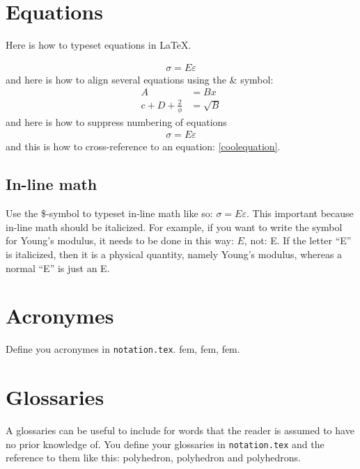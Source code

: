 \section{Equations}
Here is how to typeset equations in \LaTeX{}.

\begin{align}
\sigma = E\varepsilon \label{coolequation}
\end{align}
and here is how to align several equations using the \& symbol:
\begin{align}
A &= Bx \\ %
c + D +\frac{2}{\phi} &= \sqrt{B}
\end{align}
and here is how to suppress numbering of equations
\begin{align*}
\sigma = E\varepsilon
\end{align*}
and this is how to cross-reference to an equation: \cref{coolequation}.

\subsection{In-line math}
Use the \$-symbol to typeset in-line math like so: $\sigma = E\varepsilon$. This important because in-line math should be italicized. For example, if you want to write the symbol for Young's modulus, it needs to be done in this way: $E$, not: E. If the letter ``E'' is italicized, then it is a physical quantity, namely Young's modulus, whereas a normal ``E'' is just an E.

\section{Acronymes}
Define you acronymes in \texttt{notation.tex}. \acrlong{fem}, \acrshort{fem}, \acrfull{fem}.

\section{Glossaries}
A glossaries can be useful to include for words that the reader is assumed to have no prior knowledge of. You define your glossaries in \texttt{notation.tex} and the reference to them like this: \Gls{polyhedron}, \gls{polyhedron} and \glspl{polyhedron}.